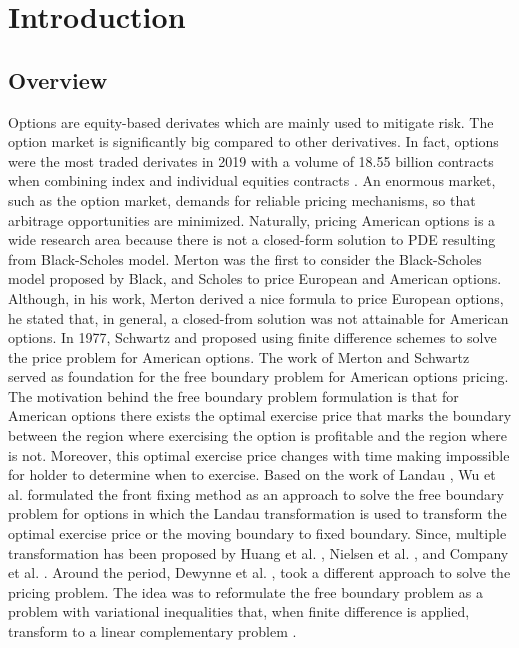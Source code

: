 \section{Introduction}

\subsection{Overview}

Options are equity-based derivates which are mainly used to mitigate risk. The option market is significantly big compared to other derivatives. In fact, options were the most traded derivates in 2019 with a volume of 18.55 billion contracts when combining index and individual equities contracts \cite{statista_2019}. An enormous market, such as the option market, demands for reliable pricing mechanisms, so that arbitrage opportunities are minimized. Naturally, pricing American options is a wide research area because there is not a closed-form solution to PDE resulting from Black-Scholes model. Merton \cite{merton_1973} was the first to consider the Black-Scholes model proposed by Black, and Scholes \cite{black_scholes_1973} to price European and American options. Although, in his work, Merton derived a nice formula to price European options, he stated that, in general, a closed-from solution was not attainable for American options. In 1977, Schwartz \cite*{schwartz_197779} and \cite{brennan_1997} proposed using finite difference schemes  to solve the price problem for American options. The work of Merton and Schwartz served as foundation for the free boundary problem for American options pricing. The motivation behind the free boundary problem formulation is that for American options there exists the optimal exercise price that marks the boundary between the region where exercising the option is profitable and the region where is not. Moreover, this optimal exercise price changes with time making impossible for holder to determine when to exercise. Based on the work of Landau \cite {landau_1950_heat_ci}, Wu et al. \cite{wu1997front} formulated the front fixing method as an approach to solve the free boundary problem for options in which the Landau transformation is used to transform the optimal exercise price or the moving boundary to fixed boundary. Since, multiple transformation has been proposed by Huang et al. \cite*{huang_2000}, Nielsen et al. \cite*{nielsen_2001}, and Company et al. \cite*{company_egorova_jodar_2014}. Around the period, Dewynne et al. \cite*{dewynne_howison_rupf_wilmott_1993}, took a different approach to solve the pricing problem. The idea was to reformulate the free boundary problem as a problem with variational inequalities that, when finite difference is applied, transform to a linear complementary problem \cite{dantzig_1968}.

